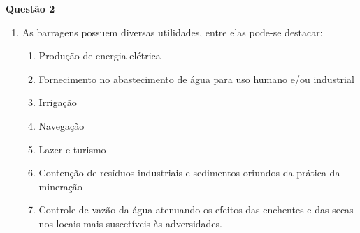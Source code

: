 \item[]\textbf{Questão 2}

\begin{enumerate}
	\item As barragens possuem diversas utilidades, entre elas pode-se destacar:
	\begin{enumerate}
		\item Produção de energia elétrica
		\item Fornecimento no abastecimento de água para uso humano e/ou industrial
		\item Irrigação
		\item Navegação
		\item Lazer e turismo
		\item Contenção de resíduos industriais e sedimentos oriundos da prática da mineração
		\item Controle de vazão da água atenuando os efeitos das enchentes e das secas nos locais mais suscetíveis às adversidades.
	\end{enumerate}
\end{enumerate}
